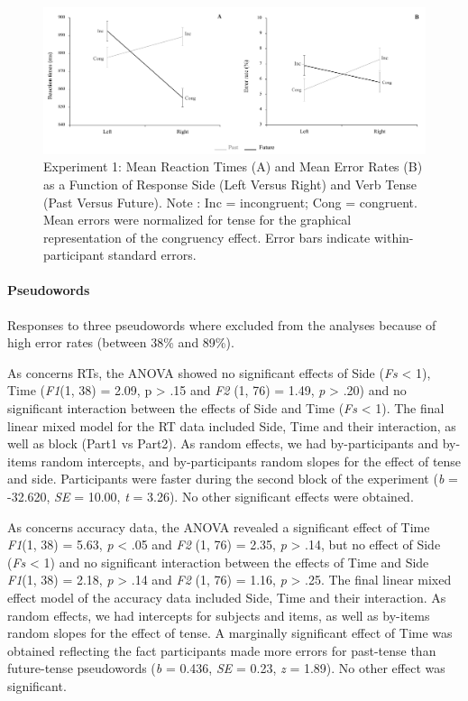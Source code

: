 \documentclass[
  a4paper,12pt,twoside,onecolumn,openright,final,oldfontcommands]{memoir}
\begin{document}
\begin{figure}[htbp!]

{\centering \includegraphics[width=1\linewidth]{figures/chap-3-fig3} 

}

\caption{Experiment 1: Mean Reaction Times (A) and Mean Error Rates (B) as a Function of Response Side (Left Versus Right) and Verb Tense (Past Versus Future). Note : Inc = incongruent; Cong = congruent. Mean errors were normalized for tense for the graphical representation of the congruency effect. Error bars indicate within-participant standard errors.}\label{fig:chap-3-fig3}
\end{figure}

\hypertarget{pseudowords}{%
\paragraph{Pseudowords}\label{pseudowords}}

Responses to three pseudowords where excluded from the analyses because of high error rates (between 38\% and 89\%).

As concerns RTs, the ANOVA showed no significant effects of Side (\emph{Fs} \textless{} 1), Time (\emph{F1}(1, 38) = 2.09, p \textgreater{} .15 and \emph{F2} (1, 76) = 1.49, \emph{p} \textgreater{} .20) and no significant interaction between the effects of Side and Time (\emph{Fs} \textless{} 1). The final linear mixed model for the RT data included Side, Time and their interaction, as well as block (Part1 vs Part2). As random effects, we had by-participants and by-items random intercepts, and by-participants random slopes for the effect of tense and side. Participants were faster during the second block of the experiment (\emph{b} = -32.620, \emph{SE} = 10.00, \emph{t} = 3.26). No other significant effects were obtained.

As concerns accuracy data, the ANOVA revealed a significant effect of Time \emph{F1}(1, 38) = 5.63, \emph{p} \textless{} .05 and \emph{F2} (1, 76) = 2.35, \emph{p} \textgreater{} .14, but no effect of Side (\emph{Fs} \textless{} 1) and no significant interaction between the effects of Time and Side \emph{F1}(1, 38) = 2.18, \emph{p} \textgreater{} .14 and \emph{F2} (1, 76) = 1.16, \emph{p} \textgreater{} .25. The final linear mixed effect model of the accuracy data included Side, Time and their interaction. As random effects, we had intercepts for subjects and items, as well as by-items random slopes for the effect of tense. A marginally significant effect of Time was obtained reflecting the fact participants made more errors for past-tense than future-tense pseudowords (\emph{b} = 0.436, \emph{SE} = 0.23, \emph{z} = 1.89). No other effect was significant.
\end{document}
